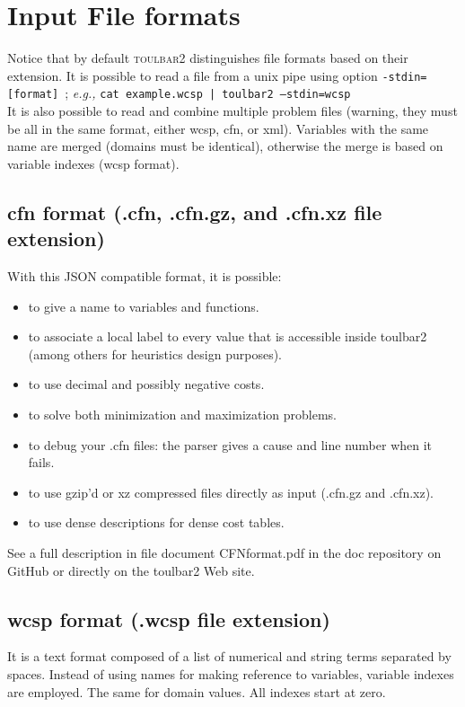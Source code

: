 \documentclass{article}
\def\toulbar2{\textsc{toulbar2}}
\begin{document}
\section{Input File formats}
\label{file-formats}
Notice that by default \toulbar2 distinguishes file formats based on their extension. 
It is possible to read a file from a unix pipe using option {\tt -stdin=[format]}~; {\em e.g.,} {\tt cat example.wcsp | toulbar2 --stdin=wcsp}\\

It is also possible to read and combine multiple problem files (warning, they must be all in the same format, either wcsp, cfn, or xml). 
Variables with the same name are merged (domains must be identical), otherwise the merge is based on variable indexes (wcsp format).

\subsection{cfn format (.cfn, .cfn.gz, and .cfn.xz file extension)}
With this JSON compatible format, it is possible:
\begin{itemize}
\item to give a name to variables and functions.
\item to associate a local label to every value that is accessible inside toulbar2 (among others for heuristics design purposes).
\item to use decimal and possibly negative costs.
\item to solve both minimization and maximization problems.
\item to debug  your .cfn files: the parser gives a cause and line number when it fails.
\item to use gzip'd or xz compressed files directly as input (.cfn.gz and .cfn.xz).
\item to use dense descriptions for dense cost tables.
\end{itemize}

See a full description in file document CFNformat.pdf in the doc repository on GitHub or directly on the toulbar2 Web site.

\subsection{wcsp format (.wcsp file extension)}

It is a text format composed of a list of numerical and string terms separated by spaces. Instead of using names for making reference to variables, variable indexes are employed. The same for domain values. All indexes start at zero.
\end{document}
